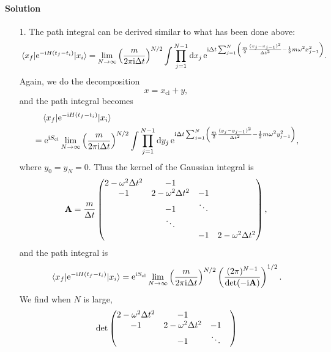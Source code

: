 \documentclass[hyperref, a4paper]{article}
\newcommand*{\ii}{\mathrm{i}}
\newcommand*{\ee}{\mathrm{e}}
\begin{document}
\paragraph{Solution} \begin{itemize}
\item[1.] The path integral can be derived similar to what has been done above:
\begin{equation}
    \mel*{x_f}{\ee^{- \ii H (t_f - t_i)}}{x_i} = 
    \lim_{N \to \infty} \left( \frac{m}{2\pi \ii \Delta t} \right)^{N/2} 
    \int \prod_{j=1}^{N-1} \dd{x_j}
    \ee^{\ii \Delta t \sum_{j=1}^N \left( \frac{m}{2} \frac{(x_j - x_{j-1})^2}{\Delta t^2} - \frac{1}{2} m \omega^2 x_{j-1}^2  \right)}.
\end{equation}
Again, we do the decomposition 
\begin{equation}
    x = x_{\text{cl}} + y,
\end{equation}
and the path integral becomes 
\[
    \begin{aligned}
        &\quad \mel*{x_f}{\ee^{- \ii H (t_f - t_i)}}{x_i} \\
        &= \ee^{\ii S_{\text{cl}}} 
        \lim_{N \to \infty} \left( \frac{m}{2\pi \ii \Delta t} \right)^{N/2} 
        \int \prod_{j=1}^{N-1} \dd{y_j}
        \ee^{\ii \Delta t \sum_{j=1}^N \left( \frac{m}{2} \frac{(y_j - y_{j-1})^2}{\Delta t^2} - \frac{1}{2} m \omega^2 y_{j-1}^2  \right)},
    \end{aligned}
\]
where $y_0 = y_N = 0$.
Thus the kernel of the Gaussian integral is
\[
    \vb{A} = \frac{m}{\Delta t} \pmqty{
        2 - \omega^2 \Delta t^2 & -1 & & \\
        -1 & 2 - \omega^2 \Delta t^2 & -1 & \\
        & -1 & \ddots \\
        & \ddots \\
        & & -1 & 2 - \omega^2 \Delta t^2
    },
\]
and the path integral is 
\begin{equation}
    \mel*{x_f}{\ee^{- \ii H (t_f - t_i)}}{x_i} = \ee^{\ii S_{\text{cl}}} 
    \lim_{N \to \infty} \left( \frac{m}{2\pi \ii \Delta t} \right)^{N/2} 
    \left( \frac{(2\pi)^{N-1}}{\det (- \ii \vb{A})} \right)^{1/2}.
\end{equation}
We find when $N$ is large,
\[
    \begin{aligned}
        &\quad \det \pmqty{
        2 - \omega^2 \Delta t^2 & -1 & & \\
        -1 & 2 - \omega^2 \Delta t^2 & -1 & \\
        & -1 & \ddots \\
}
\end{aligned}\]
\end{itemize}
\end{document}
